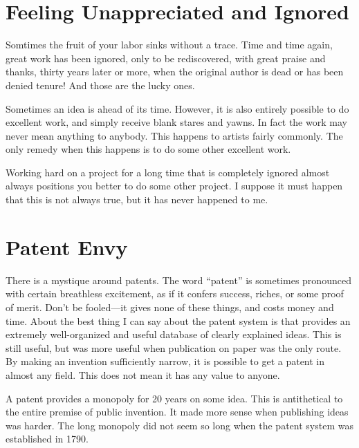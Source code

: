 \documentclass[
	fontsize=10pt, %
	twoside=false, %
	secnumdepth=1, %
]{kaobook}
\begin{document}
\section{Feeling Unappreciated and Ignored}

Somtimes the fruit of your labor sinks without a trace.
Time and time again, great work has been ignored, only to be
rediscovered, with great praise and thanks, thirty years later or more,
when the original author is dead or has been denied tenure!
And those are the lucky ones.

Sometimes an idea is ahead of its time.
However, it is also entirely possible to do excellent work, and simply
receive blank stares and yawns.
In fact the work may never
mean anything to anybody.
This happens to artists fairly commonly.
The only remedy when this happens is to do some other excellent work.

Working hard on a project for a long time that is completely ignored
almost always positions you better to do some other project.
I suppose it must happen that this is not always true,
but it has never happened to me.

\section{Patent Envy}
\label{sec:patentenvy}

There is a mystique around patents.
The word ``patent'' is sometimes pronounced with certain
breathless excitement, as if it confers success, riches,
or some proof of merit.
Don't be fooled---it gives none of these things,
and costs money and time.
About the best thing I can say about the patent system
is that provides an extremely well-organized and useful
database of clearly explained ideas.
This is still useful, but was more useful
when publication on paper was the only route.
By making an invention sufficiently narrow, it
is possible to get a patent in almost any field.
This does not mean it has any value to anyone.

A patent provides a monopoly for 20 years on some idea.
This is antithetical to the entire premise of public invention.
It made more sense when publishing ideas was harder.
The long monopoly did not seem so long when the patent system
was established in 1790.
\end{document}
